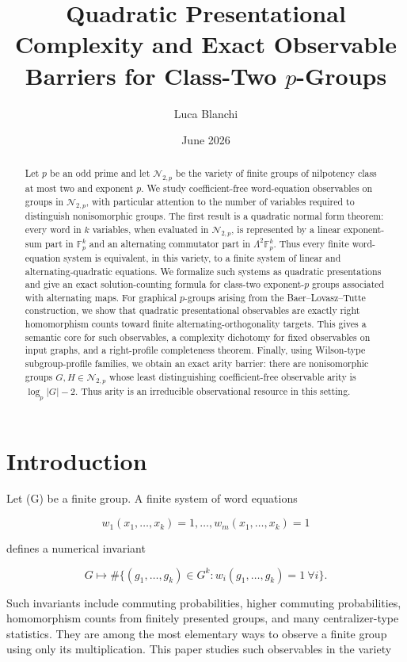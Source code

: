 \documentclass[11pt]{article}
\title{Quadratic Presentational Complexity and Exact Observable Barriers for Class-Two $p$-Groups}
\author{Luca Blanchi}
\date{June 2026}
\begin{document}
\maketitle

\begin{abstract}
Let $p$ be an odd prime and let $\mathcal N_{2,p}$ be the variety of finite groups of nilpotency class at most two and exponent $p$. We study coefficient-free word-equation observables on groups in $\mathcal N_{2,p}$, with particular attention to the number of variables required to distinguish nonisomorphic groups. The first result is a quadratic normal form theorem: every word in $k$ variables, when evaluated in $\mathcal N_{2,p}$, is represented by a linear exponent-sum part in $\mathbb F_p^k$ and an alternating commutator part in $\Lambda^2\mathbb F_p^k$. Thus every finite word-equation system is equivalent, in this variety, to a finite system of linear and alternating-quadratic equations. We formalize such systems as quadratic presentations and give an exact solution-counting formula for class-two exponent-$p$ groups associated with alternating maps. For graphical $p$-groups arising from the Baer--Lovasz--Tutte construction, we show that quadratic presentational observables are exactly right homomorphism counts toward finite alternating-orthogonality targets. This gives a semantic core for such observables, a complexity dichotomy for fixed observables on input graphs, and a right-profile completeness theorem. Finally, using Wilson-type subgroup-profile families, we obtain an exact arity barrier: there are nonisomorphic groups $G,H\in\mathcal N_{2,p}$ whose least distinguishing coefficient-free observable arity is $\log_p |G|-2$. Thus arity is an irreducible observational resource in this setting.
\end{abstract}

\section{Introduction}

Let (G) be a finite group. A finite system of word equations

\[
w_1(x_1,\dots,x_k)=1,\dots,w_m(x_1,\dots,x_k)=1
\]

defines a numerical invariant

\[
G\longmapsto
\#\{(g_1,\dots,g_k)\in G^k:
w_i(g_1,\dots,g_k)=1\ \forall i\}.
\]

Such invariants include commuting probabilities, higher commuting probabilities, homomorphism counts from finitely presented groups, and many centralizer-type statistics. They are among the most elementary ways to observe a finite group using only its multiplication. This paper studies such observables in the variety
\end{document}
